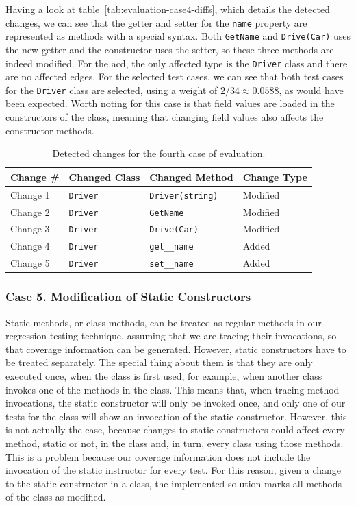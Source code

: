 \documentclass[a4paper,english,12pt]{report}
\newcommand{\textcf}{\texttt}
\begin{document}
Having a look at table~\vref{tab:evaluation-case4-diffs}, which details the detected changes, we can see that the getter and setter for the \textcf{name} property are represented as methods with a special syntax. Both \textcf{GetName} and \textcf{Drive(Car)} uses the new getter and the constructor uses the setter, so these three methods are indeed modified. For the \gls{acd}, the only affected type is the \textcf{Driver} class and there are no affected edges. For the selected test cases, we can see that both test cases for the \textcf{Driver} class are selected, using a weight of $2/34 \approx 0.0588$, as would have been expected. Worth noting for this case is that field values are loaded in the constructors of the class, meaning that changing field values also affects the constructor methods.

\begin{table}[htbp]
  \centering
  \begin{tabular}{|l|l|l|l|}
    \hline
    \textbf{Change \#} & \textbf{Changed Class} & \textbf{Changed Method} & \textbf{Change Type}\\
    \hline
    Change 1 & \textcf{Driver} & \textcf{Driver(string)} & Modified\\
    \hline
    Change 2 & \textcf{Driver} & \textcf{GetName} & Modified\\
    \hline
    Change 3 & \textcf{Driver} & \textcf{Drive(Car)} & Modified\\
    \hline
    Change 4 & \textcf{Driver} & \textcf{get\_\_}\textcf{name} & Added\\
    \hline
    Change 5 & \textcf{Driver} & \textcf{set\_\_}\textcf{name} & Added\\
    \hline
  \end{tabular}
  \caption{Detected changes for the fourth case of evaluation.}
  \label{tab:evaluation-case4-diffs}
\end{table}

\subsubsection{Case 5. Modification of Static Constructors}
Static methods, or class methods, can be treated as regular methods in our regression testing technique, assuming that we are tracing their invocations, so that coverage information can be generated. However, static constructors have to be treated separately. The special thing about them is that they are only executed once, when the class is first used, for example, when another class invokes one of the methods in the class. This means that, when tracing method invocations, the static constructor will only be invoked once, and only one of our tests for the class will show an invocation of the static constructor. However, this is not actually the case, because changes to static constructors could affect every method, static or not, in the class and, in turn, every class using those methods. This is a problem because our coverage information does not include the invocation of the static instructor for every test. For this reason, given a change to the static constructor in a class, the implemented solution marks all methods of the class as modified.
\end{document}
